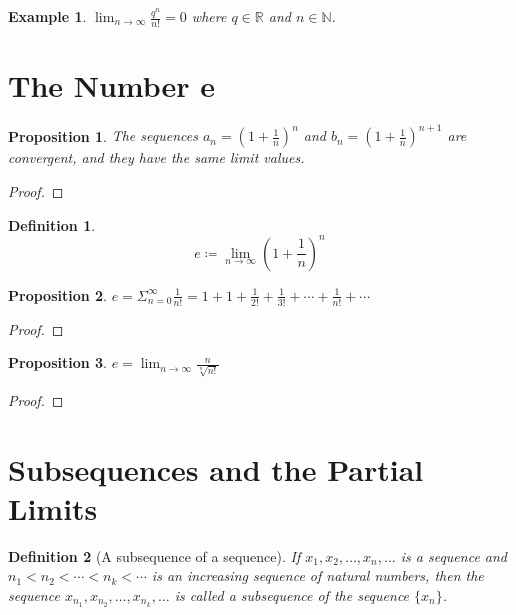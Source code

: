 \documentclass[onecolumn]{ctexart}
\newtheorem{definition}{Definition}
\newtheorem{proposition}{Proposition}
\newtheorem{example}{Example}
\begin{document}
\begin{example}
  $\lim_{n \to \infty} \frac{q^n}{n!} = 0$ where $q \in \mathbb{R}$ and $n \in \mathbb{N}$.
\end{example}

\section{The Number e}

\begin{proposition}
  The sequences $a_n = (1 + \frac{1}{n})^n$ and $b_n = (1 + \frac{1}{n})^{n+1}$ 
  are convergent, and they have the same limit values.
\end{proposition}
\begin{proof}
  
\end{proof}

\begin{definition}
  \[
    e \coloneqq \lim_{n \to \infty} (1 + \frac{1}{n})^n
  \]
\end{definition}

\begin{proposition}
  $e = \Sigma_{n=0}^{\infty} \frac{1}{n!} = 1 + 1 + \frac{1}{2!} + \frac{1}{3!} + \cdots + \frac{1}{n!} + \cdots$
\end{proposition}
\begin{proof}
  
\end{proof}

\begin{proposition}
  $e = \lim_{n \to \infty} \frac{n}{\sqrt[n]{n!}}$
\end{proposition}
\begin{proof}
  
\end{proof}

\section{Subsequences and the Partial Limits}

\begin{definition}[A subsequence of a sequence]
  If $x_1, x_2, \ldots, x_n, \ldots$ is a sequence and $n_1 < n_2 < \cdots < n_k 
  < \cdots$ is an increasing sequence of natural numbers, then the sequence 
  $x_{n_1}, x_{n_2}, \ldots, x_{n_k}, \ldots$ is called a subsequence of the 
  sequence $\lbrace x_n \rbrace$.
\end{definition}
\end{document}
